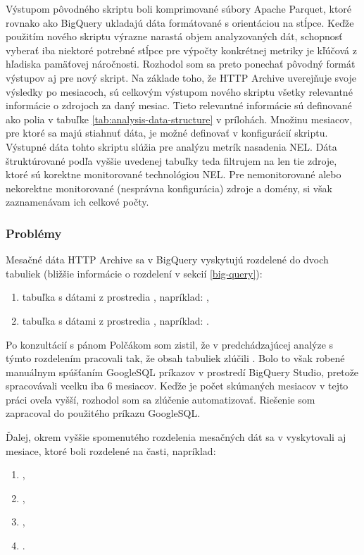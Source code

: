 Výstupom pôvodného skriptu boli komprimované súbory Apache Parquet, ktoré rovnako ako BigQuery ukladajú dáta formátované s orientáciou na stĺpce.
Keďže použitím nového skriptu výrazne narastá objem analyzovaných dát, schopnosť vyberať iba niektoré potrebné stĺpce pre výpočty konkrétnej metriky je kľúčová z hľadiska pamäťovej náročnosti.
Rozhodol som sa preto ponechať pôvodný formát výstupov aj pre nový skript. 
Na základe toho, že HTTP Archive uverejňuje svoje výsledky po mesiacoch, sú celkovým výstupom 
nového skriptu všetky relevantné informácie o zdrojoch za daný mesiac.
Tieto relevantné informácie sú definované ako polia v tabuľke \ref{tab:analysis-data-structure} v prílohách.
Množinu mesiacov, pre ktoré sa majú stiahnuť dáta, je možné definovať v konfigurácií skriptu.
Výstupné dáta tohto skriptu slúžia pre analýzu metrík nasadenia NEL.
Dáta štruktúrované podľa vyššie uvedenej tabuľky teda filtrujem na len tie zdroje, ktoré sú korektne monitorované technológiou NEL.
Pre nemonitorované alebo nekorektne monitorované (nesprávna konfigurácia) zdroje a domény, si však zaznamenávam ich celkové počty.

\subsubsection{Problémy}

Mesačné dáta HTTP Archive sa v BigQuery vyskytujú rozdelené do dvoch tabuliek (bližšie informácie o rozdelení v sekcií \ref{big-query}):
\begin{enumerate}
    \item tabuľka s dátami z prostredia , napríklad: ,
    \item tabuľka s dátami z prostredia , napríklad: .
\end{enumerate}

Po konzultácií s pánom Polčákom som zistil, že v predchádzajúcej analýze s týmto rozdelením pracovali tak, že obsah tabuliek zlúčili \cite{nel-http-archive}.
Bolo to však robené manuálnym spúšťaním GoogleSQL príkazov v prostredí BigQuery Studio, pretože spracovávali vcelku iba 6 mesiacov.
Keďže je počet skúmaných mesiacov v tejto práci oveľa vyšší, rozhodol som sa zlúčenie automatizovať.
Riešenie som zapracoval do použitého príkazu GoogleSQL.

Ďalej, okrem vyššie spomenutého rozdelenia mesačných dát sa v vyskytovali aj mesiace, ktoré boli rozdelené na časti, napríklad:
\begin{enumerate}
    \item {},
    \item {},
    \item {},
    \item {}.
\end{enumerate}

